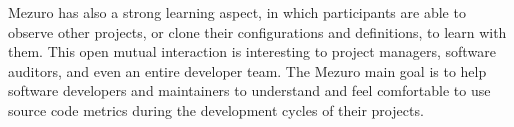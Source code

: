 Mezuro has also a strong learning aspect, in which participants are able to
observe other projects, or clone their configurations and definitions, to learn
with them. This open mutual interaction is interesting to project managers,
software auditors, and even an entire developer team. The Mezuro main goal is to
help software developers and maintainers to understand and feel comfortable to
use source code metrics during the development cycles of their projects.

